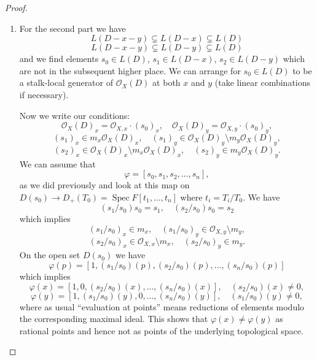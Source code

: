 \documentclass[12pt]{article}
\numberwithin{equation}{section}
\theoremstyle{definition}
\theoremstyle{remark}
\newcommand{\Ocal}{\mathcal{O}}
\newcommand{\PP}{\mathbb{P}}
\newcommand{\Spec}{\operatorname{Spec}}
\begin{document}
\begin{proof}
\begin{enumerate}
Now we write our conditions:
$$ (s_1)_x \in m_x \Ocal_X(D)_x\setminus m_x^2 \Ocal_X(D)_x, \quad (s_1/s_0)_x (s_0)_x = (s_1)_x $$
$$ (s_2)_x \in m_x^2 \Ocal_X(D)_x, \quad (s_2/s_0)_x (s_0)_x = (s_2)_x $$
which implies 
 $$ (s_1/s_0)_x \in m_x\setminus m_x^2, \quad (s_2/s_0)_x \in m_x^2 $$
since $\Ocal_{X,x}$ is a DVR this implies that $(s_1/s_0)_x$ is a generator and the map 
 $$ m_{\varphi(x)} \to m_x $$
is surjective and hence the map $m_{\varphi(x)} \to m_x/m_x^2$ is surjective and hence $m_{\varphi(x)}/m_{\varphi(x)}^2 \to m_x/m_x^2$ is surjective.
Since $m_x/m_x^2 = (T_xX)^{\vee}$ as $\kappa(x)$-vector space this proves injectivity of $T_xX \to T_{\varphi(x)}\PP^n$.
\item For the second part we have 
 $$ L(D-x-y) \subsetneq L(D-x) \subsetneq L(D) $$
 $$L(D-x-y) \subsetneq L(D-y) \subsetneq L(D) $$
 and we find elements $s_0 \in L(D)$, $s_1\in L(D-x)$, $s_2 \in L(D-y)$ which are not in the subsequent higher place. 
 We can arrange for $s_0\in L(D)$ to be a stalk-local generator of $\Ocal_X(D)$ at both $x$ and $y$ (take linear combinations if necessary).

Now we write our conditions:
  $$ \Ocal_X(D)_x = \Ocal_{X,x}\cdot (s_0)_x, \quad \Ocal_X(D)_y = \Ocal_{X,y}\cdot (s_0)_y, $$
  $$ (s_1)_x \in m_x \Ocal_X(D)_x, \quad (s_1)_y \in \Ocal_X(D)_y\setminus m_y \Ocal_X(D)_y,$$
  $$ (s_2)_x \in \Ocal_X(D)_x \setminus m_x \Ocal_X(D)_x, \quad (s_2)_y \in m_y \Ocal_X(D)_y. $$
We can assume that 
 $$ \varphi= [s_0,s_1,s_2,\ldots,s_n], $$
as we did previously and look at this map on $D(s_0) \to D_+(T_0) = \Spec F[t_1,\ldots,t_n]$ where $t_i = T_i/T_0$.
We have 
 $$ (s_1/s_0) s_0 = s_1, \quad (s_2/s_0) s_0 = s_2 $$
which implies
 $$ (s_1/s_0)_x \in m_x, \quad (s_1/s_0)_y \in \Ocal_{X,y}\setminus m_y, $$
 $$ (s_2/s_0)_x \in \Ocal_{X,x}\setminus m_x, \quad (s_2/s_0)_y \in m_y. $$
On the open set $D(s_0)$ we have
 $$ \varphi(p) = [1, (s_1/s_0)(p), (s_2/s_0)(p),\ldots, (s_n/s_0)(p) ] $$
which implies 
 $$ \varphi(x) = [1, 0, (s_2/s_0)(x), \ldots, (s_n/s_0)(x) ], \quad (s_2/s_0)(x)\neq 0, $$
 $$ \varphi(y) = [1, (s_1/s_0)(y), 0, \ldots, (s_n/s_0)(y) ], \quad (s_1/s_0)(y)\neq 0, $$
where as usual ``evaluation at points'' means reductions of elements modulo the corresponding maximal ideal. 
This shows that $\varphi(x)\neq \varphi(y)$ as rational points and hence not as points of the underlying topological space.
\end{enumerate}
\end{proof}
\end{document}
